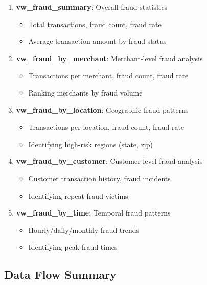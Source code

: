 \begin{enumerate}
    \item \textbf{vw\_fraud\_summary}: Overall fraud statistics
    \begin{itemize}
        \item Total transactions, fraud count, fraud rate
        \item Average transaction amount by fraud status
    \end{itemize}
    
    \item \textbf{vw\_fraud\_by\_merchant}: Merchant-level fraud analysis
    \begin{itemize}
        \item Transactions per merchant, fraud count, fraud rate
        \item Ranking merchants by fraud volume
    \end{itemize}
    
    \item \textbf{vw\_fraud\_by\_location}: Geographic fraud patterns
    \begin{itemize}
        \item Transactions per location, fraud count, fraud rate
        \item Identifying high-risk regions (state, zip)
    \end{itemize}
    
    \item \textbf{vw\_fraud\_by\_customer}: Customer-level fraud analysis
    \begin{itemize}
        \item Customer transaction history, fraud incidents
        \item Identifying repeat fraud victims
    \end{itemize}
    
    \item \textbf{vw\_fraud\_by\_time}: Temporal fraud patterns
    \begin{itemize}
        \item Hourly/daily/monthly fraud trends
        \item Identifying peak fraud times
    \end{itemize}
\end{enumerate}

\vspace{0.5cm}

\subsection{Data Flow Summary}

